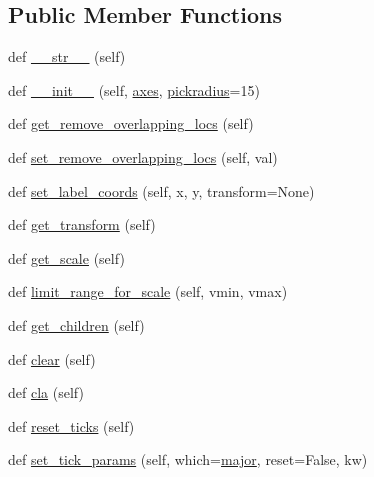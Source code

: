 \subsection*{Public Member Functions}
\begin{DoxyCompactItemize}
\item 
def \hyperlink{classmatplotlib_1_1axis_1_1Axis_a90232298e55ba6f846258a8d26fc3a6c}{\+\_\+\+\_\+str\+\_\+\+\_\+} (self)
\item 
def \hyperlink{classmatplotlib_1_1axis_1_1Axis_add4ea36bf68203607e2e81f3653b0cc9}{\+\_\+\+\_\+init\+\_\+\+\_\+} (self, \hyperlink{classmatplotlib_1_1axis_1_1Axis_a55269c0e994e1786159877159b2a2a42}{axes}, \hyperlink{classmatplotlib_1_1axis_1_1Axis_a25dc1b86cf6496a71d340ae4bb4f1c96}{pickradius}=15)
\item 
def \hyperlink{classmatplotlib_1_1axis_1_1Axis_acfa2fdfbeb414170cf0ea56b3fadc28a}{get\+\_\+remove\+\_\+overlapping\+\_\+locs} (self)
\item 
def \hyperlink{classmatplotlib_1_1axis_1_1Axis_a6443233ee004b4c4b96cad7da318d81a}{set\+\_\+remove\+\_\+overlapping\+\_\+locs} (self, val)
\item 
def \hyperlink{classmatplotlib_1_1axis_1_1Axis_a57d75f6277de367e7150b7add62f5208}{set\+\_\+label\+\_\+coords} (self, x, y, transform=None)
\item 
def \hyperlink{classmatplotlib_1_1axis_1_1Axis_af10651692ea1595c4548736dbd97ee9f}{get\+\_\+transform} (self)
\item 
def \hyperlink{classmatplotlib_1_1axis_1_1Axis_aeefde767e7d2d7e326265498df42898b}{get\+\_\+scale} (self)
\item 
def \hyperlink{classmatplotlib_1_1axis_1_1Axis_a4893adfea4b5ec77f2be7db0862fb0d6}{limit\+\_\+range\+\_\+for\+\_\+scale} (self, vmin, vmax)
\item 
def \hyperlink{classmatplotlib_1_1axis_1_1Axis_ab851a7eaf26e8441a089d6179d9d37bd}{get\+\_\+children} (self)
\item 
def \hyperlink{classmatplotlib_1_1axis_1_1Axis_ad4467e20957726703ee5ae2456714eb9}{clear} (self)
\item 
def \hyperlink{classmatplotlib_1_1axis_1_1Axis_a5c14aa0c6f782605bc11c34e51249014}{cla} (self)
\item 
def \hyperlink{classmatplotlib_1_1axis_1_1Axis_a8d27a927baa9188b6ed00dd2f0997f13}{reset\+\_\+ticks} (self)
\item 
def \hyperlink{classmatplotlib_1_1axis_1_1Axis_ac6e610348fecce29a3fe66a1af2fb05f}{set\+\_\+tick\+\_\+params} (self, which=\textquotesingle{}\hyperlink{classmatplotlib_1_1axis_1_1Axis_a349fa77c014c5e44f472634075372df2}{major}\textquotesingle{}, reset=False, kw)

\end{DoxyCompactItemize}
